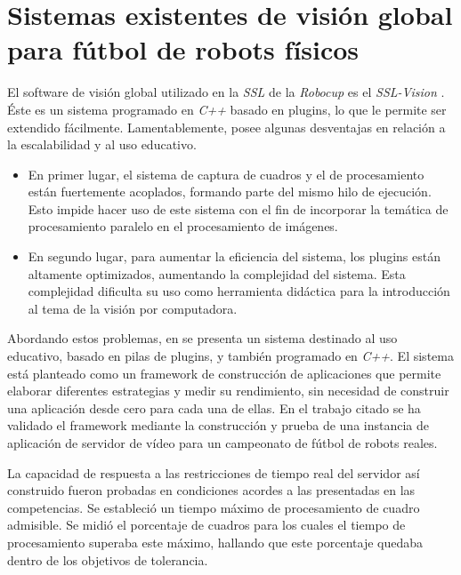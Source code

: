 
\section{Sistemas existentes de visión global para fútbol de robots físicos}

\label{svgExistentes}

El software de visión global utilizado en la \emph{SSL} de la \emph{Robocup} es
el \emph{SSL-Vision} \cite{sslvision}. Éste es un sistema programado en
\emph{C++} basado en plugins, lo que le permite ser extendido fácilmente.
Lamentablemente, posee algunas desventajas en relación a la escalabilidad y al
uso educativo.

\begin{itemize}

	\item 	En primer lugar, el sistema de captura de cuadros y el de
		procesamiento están fuertemente acoplados, formando parte del
		mismo hilo de ejecución. Esto impide hacer uso de este sistema
		con el fin de incorporar la temática de procesamiento paralelo
		en el procesamiento de imágenes.

	\item 	En segundo lugar, para aumentar la eficiencia del sistema, los
		plugins están altamente optimizados, aumentando la complejidad
		del sistema. Esta complejidad dificulta su uso como herramienta
		didáctica para la introducción al tema de la visión por
		computadora.

\end{itemize}

Abordando estos problemas, en \cite{torres2014} se presenta un sistema destinado
al uso educativo, basado en pilas de plugins, y también programado en
\emph{C++}. El sistema está planteado como un framework de construcción de
aplicaciones que permite elaborar diferentes estrategias y medir su rendimiento,
sin necesidad de construir una aplicación desde cero para cada una de ellas. En
el trabajo citado se ha validado el framework mediante la construcción y prueba
de una instancia de aplicación de servidor de vídeo para un campeonato de fútbol
de robots reales.

La capacidad de respuesta a las restricciones de tiempo real del servidor así
construido fueron probadas en condiciones acordes a las presentadas en las
competencias. Se estableció un tiempo máximo de procesamiento de cuadro
admisible. Se midió el porcentaje de cuadros para los cuales el tiempo de
procesamiento superaba este máximo, hallando que este porcentaje quedaba dentro
de los objetivos de tolerancia.

